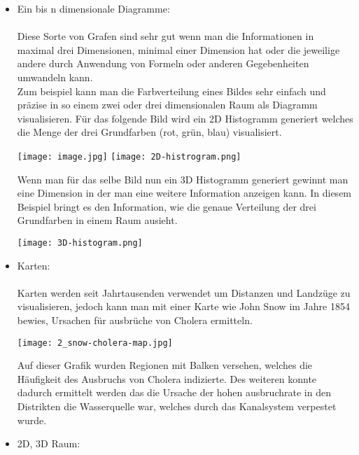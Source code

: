\begin{itemize}
\begin{itemize}
        \end{itemize}
    \newpage
    \item{Ein bis n dimensionale Diagramme:} \\ \\
        Diese Sorte von Grafen sind sehr gut wenn man die Informationen in maximal drei Dimensionen, minimal einer Dimension hat oder die
        jeweilige andere durch Anwendung von Formeln oder anderen Gegebenheiten umwandeln kann. \\
        Zum beispiel kann man die Farbverteilung eines Bildes sehr einfach und präzise in so einem zwei oder drei dimensionalen Raum als
        Diagramm visualisieren.
        Für das folgende Bild wird ein 2D Histogramm generiert welches die Menge der drei Grundfarben (rot, grün, blau) visualisiert.
        \begin{center}
            \texttt{[image: image.jpg]}
            \texttt{[image: 2D-histrogram.png]}
        \end{center}
        \newpage \noindent
        Wenn man für das selbe Bild nun ein 3D Histogramm generiert gewinnt man eine Dimension in der man eine weitere Information anzeigen
        kann. In diesem Beispiel bringt es den Information, wie die genaue Verteilung der drei Grundfarben in einem Raum ausieht.
        \begin{center}
            \texttt{[image: 3D-histogram.png]}
        \end{center}
        \newpage \noindent
    \item{Karten:} \\ \\
        Karten werden seit Jahrtausenden verwendet um Distanzen und Landzüge zu visualisieren, jedoch kann man mit einer Karte wie John Snow
        im Jahre 1854 bewies, Ursachen für ausbrüche von Cholera ermitteln.\cite{bestvisualizations}
        \begin{center}
            \texttt{[image: 2\_snow-cholera-map.jpg]}\cite{choleramap}
        \end{center}
        Auf dieser Grafik wurden Regionen mit Balken versehen, welches die Häufigkeit des Ausbruchs von Cholera indizierte. Des weiteren
        konnte dadurch ermittelt werden das die Ursache der hohen ausbruchrate in den Distrikten die Wasserquelle war, welches durch das
        Kanalsystem verpestet wurde.\cite{bestvisualizations}
        \newpage \noindent
    \item{2D, 3D Raum:} \\ \\

\end{itemize}
